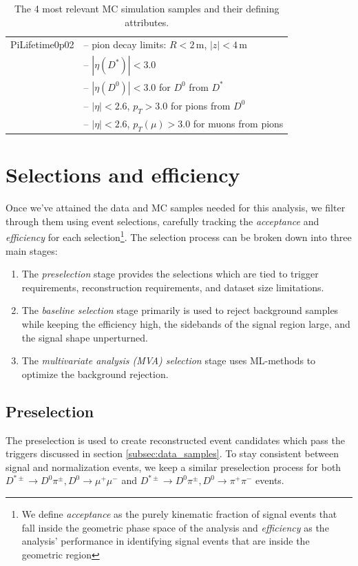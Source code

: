 \begin{table}
\begin{tabular}{|p{3.2cm}|p{12cm}|}
    PiLifetime0p02 & -- pion decay limits: $R < 2$\,m, $|z| < 4$\,m \\
    & -- $|\eta(D^*)| < 3.0$ \\
    & -- $|\eta(D^0)| < 3.0$ for $D^0$ from $D^*$ \\
    & -- $|\eta| < 2.6$, $p_T > 3.0$ for pions from $D^0$ \\
    & -- $|\eta| < 2.6$, $p_T(\mu) > 3.0$ for muons from pions \\
    \hline
\end{tabular}
\caption{The 4 most relevant MC simulation samples and their defining attributes.}
\label{tab:mc-samples}
\end{table}

\section{Selections and efficiency}
\label{sec:selections_and_efficency}

Once we've attained the data and MC samples needed for this analysis, we filter through them using event selections, carefully tracking the \textit{acceptance} and \textit{efficiency} for each selection\footnote{We define \textit{acceptance} as the purely kinematic fraction of signal events that fall inside the geometric phase space of the analysis and \textit{efficiency} as the analysis' performance in identifying signal events that are inside the geometric region}. The selection process can be broken down into three main stages:
\begin{enumerate}
    \item The \textit{preselection} stage provides the selections which are tied to trigger requirements, reconstruction requirements, and dataset size limitations.
    \item The \textit{baseline selection} stage primarily is used to reject background samples while keeping the efficiency high, the sidebands of the signal region large, and the signal shape unperturned. 
    \item The \textit{multivariate analysis (MVA) selection} stage uses ML-methods to optimize the background rejection.
\end{enumerate}

\subsection{Preselection}
\label{subsec:preselection}

The preselection is used to create reconstructed event candidates which pass the triggers discussed in section \ref{subsec:data_samples}. To stay consistent between signal and normalization events, we keep a similar preselection process for both $D^{*\pm} \to D^0 \pi^\pm, D^0 \to \mu^+ \mu^-$ and $D^{*\pm} \to D^0 \pi^\pm, D^0 \to \pi^+ \pi^-$ events.

